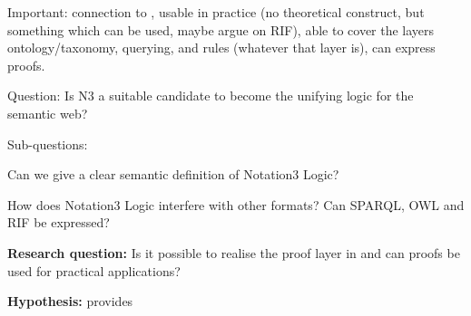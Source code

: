 Important: connection to \rdf, usable in practice (no theoretical construct, but something which can be used, maybe argue on RIF), able to cover the 
layers ontology/taxonomy, querying, and rules (whatever that layer is), can express proofs.


Question: Is N3 a suitable candidate to become the unifying logic for the semantic web?

Sub-questions:

Can we give a clear semantic definition of Notation3 Logic?

How does Notation3 Logic interfere with other formats? Can SPARQL, OWL and RIF be expressed?

\textbf{Research question:} Is it possible to realise the proof layer in \nthree and can proofs be used for practical applications?

\textbf{Hypothesis:} \nthreelogic provides 

% 
% 
% 

% 
% 


